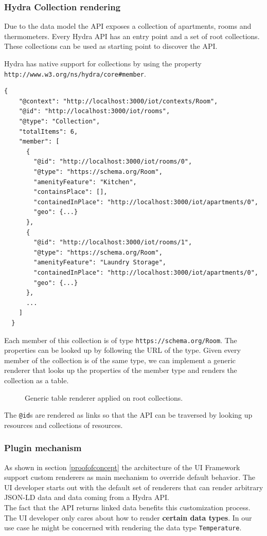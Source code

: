 \subsubsection{Hydra Collection rendering}
Due to the data model the API exposes a collection of apartments, rooms and thermometers. Every Hydra API has an entry point and a set of root collections. These collections can be used as starting point to discover the API.

Hydra has native support for collections by using the property \lstinline{http://www.w3.org/ns/hydra/core#member}.

\lstset{language=JSON}
\begin{lstlisting}[caption=Data of /rooms as Hydra collection.]
  {
    "@context": "http://localhost:3000/iot/contexts/Room",
    "@id": "http://localhost:3000/iot/rooms",
    "@type": "Collection",
    "totalItems": 6,
    "member": [
      {
        "@id": "http://localhost:3000/iot/rooms/0",
        "@type": "https://schema.org/Room",
        "amenityFeature": "Kitchen",
        "containsPlace": [],
        "containedInPlace": "http://localhost:3000/iot/apartments/0",
        "geo": {...}
      },
      {
        "@id": "http://localhost:3000/iot/rooms/1",
        "@type": "https://schema.org/Room",
        "amenityFeature": "Laundry Storage",
        "containedInPlace": "http://localhost:3000/iot/apartments/0",
        "geo": {...}
      },
      ...
    ]
  }
\end{lstlisting}

Each member of this collection is of type \lstinline{https://schema.org/Room}. The properties can be looked up by following the URL of the type. Given every member of the collection is of the same type, we can implement a generic renderer that looks up the properties of the member type and renders the collection as a table.

\begin{figure}[!htb]
  \caption{Generic table renderer applied on root collections.}
\end{figure}

The \lstinline{@id}s are rendered as links so that the API can be traversed by looking up resources and collections of resources.

\subsubsection{Plugin mechanism}
As shown in section \ref{proofofconcept} the architecture of the UI Framework support custom renderers as main mechanism to override default behavior. The UI developer starts out with the default set of renderers that can render arbitrary JSON-LD data and data coming from a Hydra API. \\
The fact that the API returns linked data benefits this customization process. The UI developer only cares about how to render \textbf{certain data types}. In our use case he might be concerned with rendering the data type \lstinline{Temperature}.

